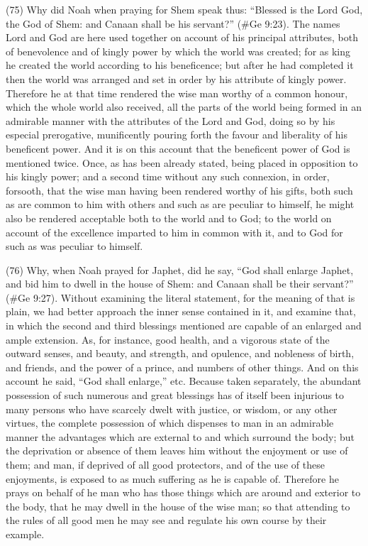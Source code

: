 (75) Why did Noah when praying for Shem speak thus: ``Blessed is the Lord God, the God of
Shem: and Canaan shall be his servant?'' (\#Ge 9:23). The names Lord and God are here
used together on account of his principal attributes, both of benevolence and of kingly power by
which the world was created; for as king he created the world according to his beneficence; but
after he had completed it then the world was arranged and set in order by his attribute of kingly
power. Therefore he at that time rendered the wise man worthy of a common honour, which the
whole world also received, all the parts of the world being formed in an admirable manner with the
attributes of the Lord and God, doing so by his especial prerogative, munificently pouring forth the
favour and liberality of his beneficent power. And it is on this account that the beneficent power of
God is mentioned twice. Once, as has been already stated, being placed in opposition to his kingly
power; and a second time without any such connexion, in order, forsooth, that the wise man having
been rendered worthy of his gifts, both such as are common to him with others and such as are
peculiar to himself, he might also be rendered acceptable both to the world and to God; to the world
on account of the excellence imparted to him in common with it, and to God for such as was
peculiar to himself.

(76) Why, when Noah prayed for Japhet, did he say, ``God shall enlarge Japhet, and bid him to
dwell in the house of Shem: and Canaan shall be their servant?'' (\#Ge 9:27). Without
examining the literal statement, for the meaning of that is plain, we had better approach the inner
sense contained in it, and examine that, in which the second and third blessings mentioned are
capable of an enlarged and ample extension. As, for instance, good health, and a vigorous state of
the outward senses, and beauty, and strength, and opulence, and nobleness of birth, and friends,
and the power of a prince, and numbers of other things. And on this account he said, ``God shall
enlarge,'' etc. Because taken separately, the abundant possession of such numerous and great
blessings has of itself been injurious to many persons who have scarcely dwelt with justice, or
wisdom, or any other virtues, the complete possession of which dispenses to man in an admirable
manner the advantages which are external to and which surround the body; but the deprivation or
absence of them leaves him without the enjoyment or use of them; and man, if deprived of all good
protectors, and of the use of these enjoyments, is exposed to as much suffering as he is capable
of. Therefore he prays on behalf of he man who has those things which are around and exterior to
the body, that he may dwell in the house of the wise man; so that attending to the rules of all good
men he may see and regulate his own course by their example.

